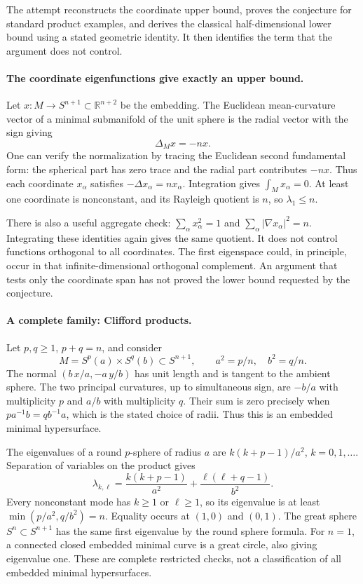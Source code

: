 \documentclass[11pt]{article}
\begin{document}
The attempt reconstructs the coordinate upper bound, proves the
conjecture for standard product examples, and derives the classical
half-dimensional lower bound using a stated geometric identity.
It then identifies the term that the argument does not control.

\paragraph{The coordinate eigenfunctions give exactly an upper bound.}
Let $x:M\to S^{n+1}\subset\mathbb R^{n+2}$ be the embedding.
The Euclidean mean-curvature vector of a minimal submanifold of the
unit sphere is the radial vector with the sign giving
\[
                            \Delta_M x=-nx.
\]
One can verify the normalization by tracing the Euclidean second
fundamental form: the spherical part has zero trace and the radial
part contributes $-nx$. Thus each coordinate $x_\alpha$ satisfies
$-\Delta x_\alpha=nx_\alpha$. Integration gives
$\int_Mx_\alpha=0$. At least one coordinate is nonconstant, and its
Rayleigh quotient is $n$, so $\lambda_1\leq n$.

There is also a useful aggregate check:
$\sum_\alpha x_\alpha^2=1$ and
$\sum_\alpha|\nabla x_\alpha|^2=n$. Integrating these identities
again gives the same quotient. It does not control functions
orthogonal to all coordinates. The first eigenspace could, in
principle, occur in that infinite-dimensional orthogonal
complement. An argument that tests only the coordinate span
has not proved the lower bound requested by the conjecture.

\paragraph{A complete family: Clifford products.}
Let $p,q\geq1$, $p+q=n$, and consider
\[
 M=S^p(a)\times S^q(b)\subset S^{n+1},
 \qquad a^2=p/n,\quad b^2=q/n.
\]
The normal $(b\,x/a,-a\,y/b)$ has unit length and is tangent to the
ambient sphere. The two principal curvatures, up to simultaneous
sign, are $-b/a$ with multiplicity $p$ and $a/b$ with multiplicity
$q$. Their sum is zero precisely when $pa^{-1}b=qb^{-1}a$, which
is the stated choice of radii. Thus this is an embedded minimal
hypersurface.

The eigenvalues of a round $p$-sphere of radius $a$ are
$k(k+p-1)/a^2$, $k=0,1,\ldots$. Separation of variables on the
product gives
\[
 \lambda_{k,\ell}
 =\frac{k(k+p-1)}{a^2}+\frac{\ell(\ell+q-1)}{b^2}.
\]
Every nonconstant mode has $k\geq1$ or $\ell\geq1$, so its
eigenvalue is at least $\min(p/a^2,q/b^2)=n$.
Equality occurs at $(1,0)$ and $(0,1)$. The great sphere
$S^n\subset S^{n+1}$ has the same first eigenvalue by the round
sphere formula. For $n=1$, a connected closed embedded minimal
curve is a great circle, also giving eigenvalue one.
These are complete restricted checks, not a classification
of all embedded minimal hypersurfaces.
\end{document}
